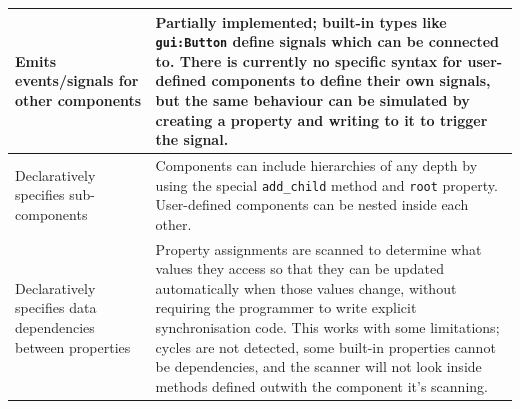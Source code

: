 \documentclass[11pt]{report}
\begin{document}
\begin{landscape}
{\begin{tabularx}{730pt} {| >{\hsize=210pt\raggedright\arraybackslash}X | >{\raggedright\arraybackslash}X |}
    \hline
    Emits events/signals for other components&Partially implemented; built-in types like \verb|gui:Button| define signals which can be connected to. There is currently no specific syntax for user-defined components to define their own signals, but the same behaviour can be simulated by creating a property and writing to it to trigger the signal.\\
    \hline
    Declaratively specifies sub-components&Components can include hierarchies of any depth by using the special \verb|add_child| method and \verb|root| property. User-defined components can be nested inside each other.\\
    \hline
    Declaratively specifies data dependencies between properties&Property assignments are scanned to determine what values they access so that they can be updated automatically when those values change, without requiring the programmer to write explicit synchronisation code. This works with some limitations; cycles are not detected, some built-in properties cannot be dependencies, and the scanner will not look inside methods defined outwith the component it's scanning.\\
\hline
\end{tabularx}
}


\end{landscape}
\end{document}
